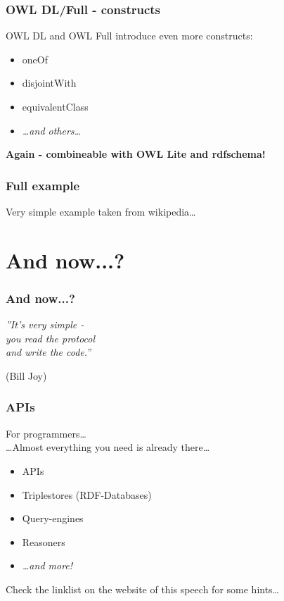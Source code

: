 \documentclass[handout]{beamer}
\begin{document}
      \begin{frame}
           \frametitle{OWL DL/Full - constructs}

           OWL DL and OWL Full introduce even more constructs:
           \vskip 0.7cm
           \begin{itemize}           
               \item oneOf
               \item disjointWith
               \item equivalentClass
               \item \textit{\ldots and others\ldots}
           \end{itemize}
           \vskip 0.7cm
           \textbf{Again - combineable with OWL Lite and rdfschema!}
       \end{frame}

       \begin{frame}
           \frametitle{Full example}

           Very simple example taken from wikipedia\ldots

       \end{frame}

    \section{And now...?}

       \begin{frame}
           \frametitle{And now...?}

            \large
            \textit{''It's very simple - \\
                you read the protocol \\
                and write the code.''}

           (Bill Joy)
      \end{frame}

       \begin{frame}
           \frametitle{APIs}

           For programmers\ldots \\
           \ldots Almost everything you need is already there\ldots
           \vskip 0.7cm
           \begin{itemize}           
               \item APIs
               \item Triplestores (RDF-Databases)
               \item Query-engines
               \item Reasoners
               \item \textit{\ldots and more!}
           \end{itemize}
           \vskip 0.7cm
           Check the linklist on the website of this speech for some hints\ldots
 
       \end{frame}
\end{document}
